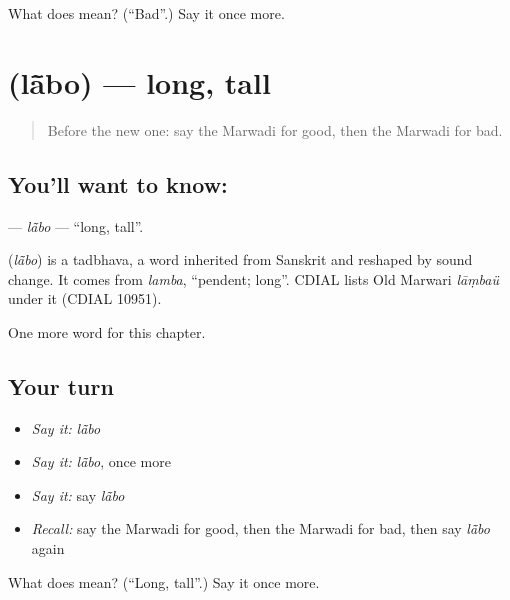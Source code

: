 \begin{tcolorbox}[breakable,colback=teal!4,colframe=teal!35!black,title={Before you move on}]
What does  mean? (\textquotedblleft{}Bad\textquotedblright{}.) Say it once more.
\end{tcolorbox}
\section[\texorpdfstring{\mw{लांबो} (lā̃bo)}{लांबो (lā̃bo)}]{ (lā̃bo) — long, tall}

\label{lesson:MW-C73-labo}



\begin{quote}
Before the new one: say the Marwadi for good, then the Marwadi for bad.
\end{quote}

\subsection*{You'll want to know: }
\textbf{} — \emph{lā̃bo} — \textquotedblleft{}long, tall\textquotedblright{}.

\begin{cousinweb}
\textbf{} (\emph{lā̃bo}) is a tadbhava, a word inherited from Sanskrit and reshaped by sound change. It comes from \emph{lamba}, \textquotedblleft{}pendent; long\textquotedblright{}. CDIAL lists Old Marwari \emph{lāṃbaü} under it (CDIAL 10951).
\end{cousinweb}

\begin{grammarlens}[title={What you've built}]
One more word for this chapter.
\end{grammarlens}

\subsection*{Your turn}
\begin{itemize}
\raggedright
  \item \emph{Say it:} \emph{lā̃bo}
  \item \emph{Say it:} \emph{lā̃bo}, once more
  \item \emph{Say it:} say \emph{lā̃bo}
  \item \emph{Recall:} say the Marwadi for good, then the Marwadi for bad, then say \emph{lā̃bo} again
\end{itemize}

\begin{tcolorbox}[breakable,colback=teal!4,colframe=teal!35!black,title={Before you move on}]
What does  mean? (\textquotedblleft{}Long, tall\textquotedblright{}.) Say it once more.
\end{tcolorbox}
